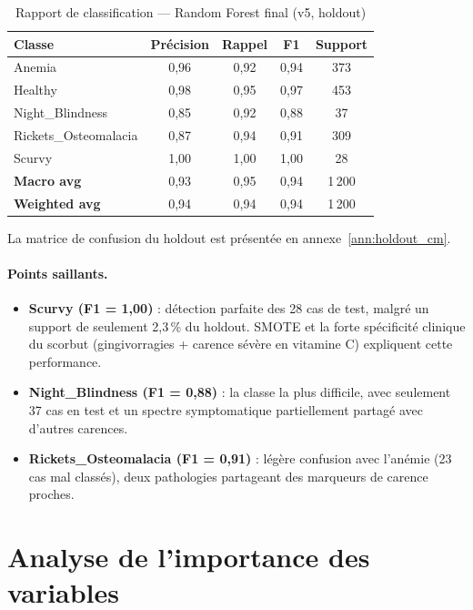 \documentclass[12pt,a4paper]{article}
\begin{document}
\begin{table}[H]
\centering
\caption{Rapport de classification --- Random Forest final (v5, holdout)}
\label{tab:perf_classe}
\begin{tabular}{lcccc}
\toprule
\textbf{Classe} & \textbf{Précision} & \textbf{Rappel} & \textbf{F1}
    & \textbf{Support} \\
\midrule
Anemia                & 0,96 & 0,92 & 0,94 & 373 \\
Healthy               & 0,98 & 0,95 & 0,97 & 453 \\
Night\_Blindness      & 0,85 & 0,92 & 0,88 &  37 \\
Rickets\_Osteomalacia & 0,87 & 0,94 & 0,91 & 309 \\
Scurvy                & 1,00 & 1,00 & 1,00 &  28 \\
\midrule
\textbf{Macro avg}    & 0,93 & 0,95 & 0,94 & 1\,200 \\
\textbf{Weighted avg} & 0,94 & 0,94 & 0,94 & 1\,200 \\
\bottomrule
\end{tabular}
\end{table}

La matrice de confusion du holdout est présentée en annexe~\ref{ann:holdout_cm}.

\paragraph{Points saillants.}
\begin{itemize}[leftmargin=2em]
    \item \textbf{Scurvy (F1 = 1,00)} : détection parfaite des 28 cas de test,
        malgré un support de seulement 2,3\,\% du holdout. SMOTE et la forte
        spécificité clinique du scorbut (gingivorragies + carence sévère en
        vitamine C) expliquent cette performance.
    \item \textbf{Night\_Blindness (F1 = 0,88)} : la classe la plus difficile,
        avec seulement 37 cas en test et un spectre symptomatique partiellement
        partagé avec d'autres carences.
    \item \textbf{Rickets\_Osteomalacia (F1 = 0,91)} : légère confusion avec
        l'anémie (23 cas mal classés), deux pathologies partageant des marqueurs
        de carence proches.
\end{itemize}

\section{Analyse de l'importance des variables}
\end{document}
